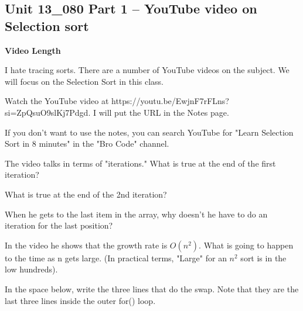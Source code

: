 \documentclass[letterpaper,12pt]{exam}
\newcommand{\unit}{Unit 13}
\begin{document}
\begin{questions}
\section*{\unit\_080 Part 1 -- YouTube video on Selection sort } 
\par{\selectfont\textbf{Video Length }}

I hate tracing sorts.  There are a number of YouTube videos on the subject.  We will focus on the Selection Sort in this class.

Watch the YouTube video at https://youtu.be/EwjnF7rFLns?si=ZpQsuO9slKj7Pdgd.  I will put the URL in the Notes page.

If you don't want to use the notes, you can search YouTube for "Learn Selection Sort in 8 minutes" in the "Bro Code" channel.

\begin{samepage}
    \question The video talks in terms of "iterations."  What is true at the end of the first iteration?
    \vspace{5mm}
\end{samepage}
\begin{samepage}
    \question What is true at the end of the 2nd iteration?
    \vspace{5mm}
\end{samepage}

\begin{samepage}
    \question When he gets to the last item in the array, why doesn't he have to do an iteration for the last position?
    \vspace{5mm}
\end{samepage}
\begin{samepage}
    \question In the video he shows that the growth rate is $O(n^2)$.  What is going to happen to the time as n gets large.  (In practical terms, "Large" for an $n^2$ sort is in the low hundreds). 
    \vspace{5mm}
\end{samepage}
\begin{samepage}
    \question In the space below, write the three lines that do the swap.  Note that they are the last three lines inside the outer for() loop.
    \vspace{25mm}
\end{samepage}




\end{questions}
\end{document}
